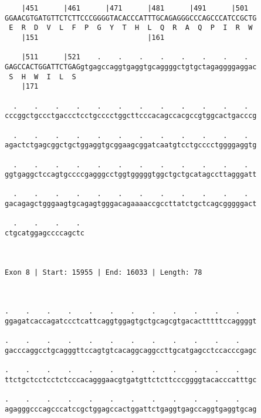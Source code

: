 \documentclass{article}
\begin{document}
\begin{Verbatim}
    |451      |461      |471      |481      |491      |501  
GGAACGTGATGTTCTCTTCCCGGGGTACACCCATTTGCAGAGGGCCCAGCCCATCCGCTG
 E  R  D  V  L  F  P  G  Y  T  H  L  Q  R  A  Q  P  I  R  W 
    |151                          |161                      
  
    |511      |521    .    .    .    .    .    .    .    .  
GAGCCACTGGATTCTGAGgtgagccaggtgaggtgcaggggctgtgctagaggggaggac
 S  H  W  I  L  S                                           
    |171                                                    
  
  .    .    .    .    .    .    .    .    .    .    .    .  
cccggctgccctgaccctcctgcccctggcttcccacagccacgccgtggcactgacccg
                                                            
  .    .    .    .    .    .    .    .    .    .    .    .  
agactctgagcggctgctggaggtgcggaagcggatcaatgtcctgcccctggggaggtg
                                                            
  .    .    .    .    .    .    .    .    .    .    .    .  
ggtgaggctccagtgccccgagggcctggtgggggtggctgctgcatagccttagggatt
                                                            
  .    .    .    .    .    .    .    .    .    .    .    .  
gacagagctgggaagtgcagagtgggacagaaaaccgccttatctgctcagcgggggact
                                                            
  .    .    .    . 
ctgcatggagccccagctc
                   
                   
 
Exon 8 | Start: 15955 | End: 16033 | Length: 78



.    .    .    .    .    .    .    .    .    .    .    .    
ggagatcaccagatccctcattcaggtggagtgctgcagcgtgacactttttccaggggt
                                                            
.    .    .    .    .    .    .    .    .    .    .    .    
gacccaggcctgcagggttccagtgtcacaggcaggccttgcatgagcctccacccgagc
                                                            
.    .    .    .    .    .    .    .    .    .    .    .    
ttctgctcctcctctcccacagggaacgtgatgttctcttcccggggtacacccatttgc
                                                            
.    .    .    .    .    .    .    .    .    .    .    .    
agagggcccagcccatccgctggagccactggattctgaggtgagccaggtgaggtgcag
                                                            

\end{Verbatim}
\end{document}

